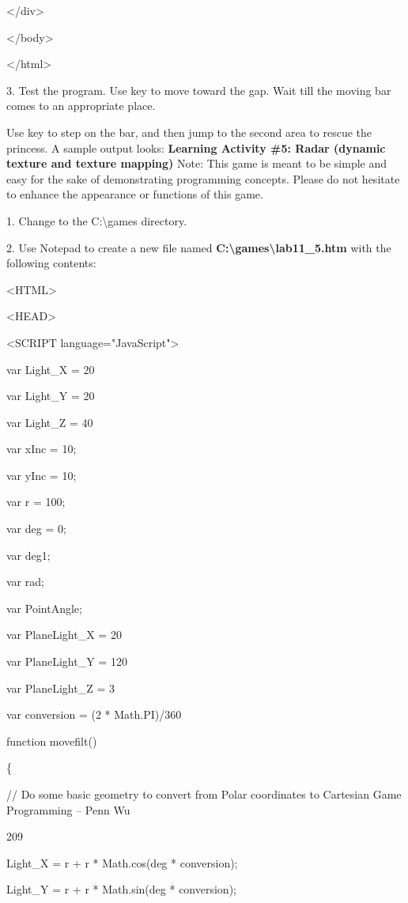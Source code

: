 \documentclass[
]{article}
\begin{document}
\textless/div\textgreater{}

\textless/body\textgreater{}

\textless/html\textgreater{}

3. Test the program. Use key to move toward the gap. Wait till the
moving bar comes to an appropriate place.

Use key to step on the bar, and then jump to the second area to rescue
the princess. A sample output looks: \textbf{Learning Activity \#5:
Radar (dynamic texture and texture mapping)} Note: This game is meant to
be simple and easy for the sake of demonstrating programming concepts.
Please do not hesitate to enhance the appearance or functions of this
game.

1. Change to the C:\textbackslash games directory.

2. Use Notepad to create a new file named
\textbf{C:\textbackslash games\textbackslash lab11\_5.htm} with the
following contents:

\textless HTML\textgreater{}

\textless HEAD\textgreater{}

\textless SCRIPT language="JavaScript"\textgreater{}

var Light\_X = 20

var Light\_Y = 20

var Light\_Z = 40

var xInc = 10;

var yInc = 10;

var r = 100;

var deg = 0;

var deg1;

var rad;

var PointAngle;

var PlaneLight\_X = 20

var PlaneLight\_Y = 120

var PlaneLight\_Z = 3

var conversion = (2 * Math.PI)/360

function movefilt()

\{

// Do some basic geometry to convert from Polar coordinates to Cartesian
Game Programming -- Penn Wu

209

\protect\hypertarget{index_split_011.htmlux5cux23p210}{}{}

Light\_X = r + r * Math.cos(deg * conversion);

Light\_Y = r + r * Math.sin(deg * conversion);
\end{document}
